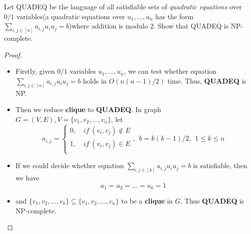 \documentclass{article}
\newcounter{exercise}
\newcommand{\<}{
    \langle}
\renewcommand{\>}{
    \rangle}
\begin{document}
{\begin{exercise}
Let \textsf{QUADEQ} be the language of all satisfiable sets of \textit{quadratic equations} over $0/1$ variables(a quadratic equations over $u_1,\ldots,u_n$ has the form $\sum_{i,j\in[n]}a_{i,j}u_iu_j=b$)where addition is modulo $2$. Show that \textsf{QUADEQ} is NP-complete.
\end{exercise}
\begin{proof}
    \leavevmode\newline
    \begin{itemize}
        \item Firstly, given $0/1$ variables $u_1,\ldots,u_n$, we can test whether equation $\sum_{i,j\in[n]}a_{i,j}u_iu_j=b$ holds in $O(n(n-1)/2)$ time. Thus, \textbf{QUADEQ} is NP.
        \item Then we reduce \textbf{clique} to \textbf{QUADEQ}. In graph $G=(V,E),V=\{v_1,v_2,\ldots,v_n\}$, let
        \begin{displaymath}
        a_{i,j}=\left\{
            \begin{aligned}
                0,\ &if\ (v_i,v_j)\notin E \\
                1,\ &if\ (v_i,v_j)\in E \\
            \end{aligned}
            \right.,\ \ b=k(k-1)/2,\ \ 1\leq k\leq n
        \end{displaymath}
        \item If we could decide whether equation $\sum_{i,j\in[k]}a_{i,j}u_iu_j=b$ is satisfiable, then we have 
        \begin{displaymath}
        u_1=u_2=\ldots =u_k=1
        \end{displaymath}
        \item and $\{v_1,v_2,\ldots,v_k\}\subseteq\{v_1,v_2,\ldots,v_n\}$ to be a \textbf{clique} in $G$. Thus \textbf{QUADEQ} is NP-complete.
    \end{itemize}
\end{proof}
\newpage


}
\end{document}
